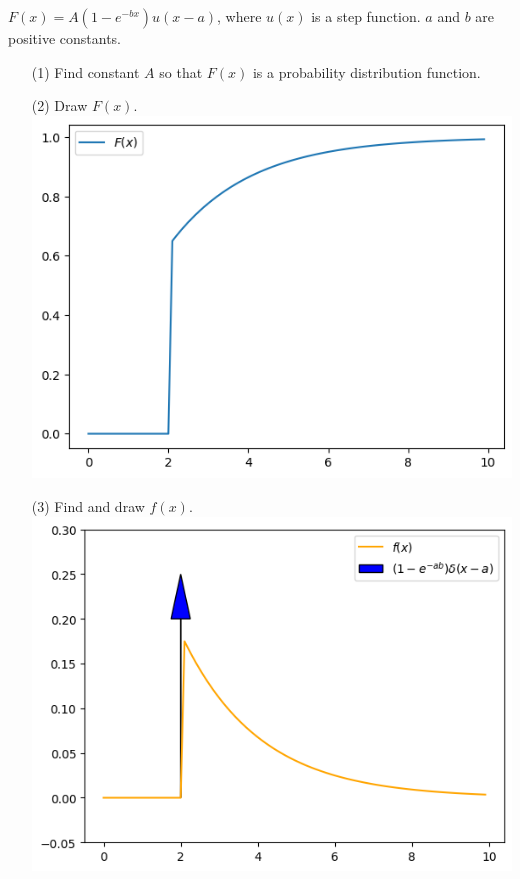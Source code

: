 \noindent {}
{$F(x) = A (1 - e^{-bx}) u(x-a)$, where $u(x)$ is a step function. $a$ and $b$ are positive constants.
\begin{enumerate}
    \item[(1)] Find constant $A$ so that $F(x)$ is a probability distribution function. \\
    \item[(2)] Draw $F(x)$. \\
    \includegraphics[width=0.5\linewidth]{HWs//HW2//figures/1-2.png}
    \item[(3)] Find and draw $f(x)$. \\
    \includegraphics[width=0.5\linewidth]{HWs//HW2//figures/1-3.png}
\end{enumerate}
}

